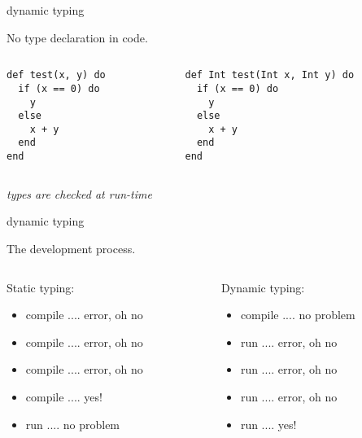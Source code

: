 \begin{frame}[fragile]{dynamic typing}

  No type declaration in code.

  \begin{columns}
   \begin{column}{0.5\textwidth}
    \begin{lstlisting}
def test(x, y) do
  if (x == 0) do
    y
  else 
    x + y
  end
end
     \end{lstlisting}
   \end{column}
   \begin{column}{0.5\textwidth}
    \begin{lstlisting}
def Int test(Int x, Int y) do
  if (x == 0) do
    y
  else 
    x + y
  end
end
     \end{lstlisting}
   \end{column}   
 \end{columns}


 \vspace{20pt}
{\em types are checked at run-time}
 
\end{frame}

\begin{frame}{dynamic typing}

  The development process. 
  \vspace{20pt}
  \begin{columns}
   \begin{column}{0.5\textwidth}
     Static typing: \pause
     \begin{itemize}
     \item compile .... error, oh no \pause
     \item compile .... error, oh no \pause
     \item compile .... error, oh no \pause
     \item compile .... yes! \pause
     \item run .... no problem \pause
     \end{itemize}
   \end{column}
   \begin{column}{0.5\textwidth}
     Dynamic typing: \pause
     \begin{itemize}
     \item compile .... no problem \pause
     \item run .... error, oh no \pause
     \item run .... error, oh no \pause
     \item run .... error, oh no \pause
     \item run .... yes! \pause       
     \end{itemize}
   \end{column}   
 \end{columns}

\end{frame}


